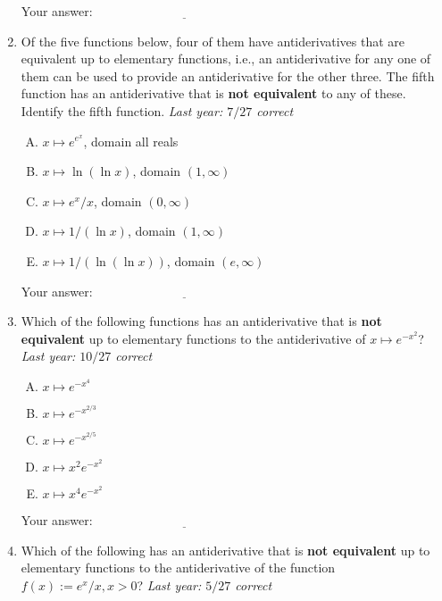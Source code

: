 \documentclass[10pt]{amsart}
\begin{document}
\begin{enumerate}
  \vspace{0.1in}
  Your answer: $\underline{\qquad\qquad\qquad\qquad\qquad\qquad\qquad}$
  \vspace{0.6in}

\item Of the five functions below, four of them have antiderivatives
  that are equivalent up to elementary functions, i.e., an
  antiderivative for any one of them can be used to provide an
  antiderivative for the other three. The fifth function has an
  antiderivative that is {\bf not equivalent} to any of these. Identify
  the fifth function. {\em Last year: $7/27$ correct}

  \begin{enumerate}[(A)]
  \item $x \mapsto e^{e^x}$, domain all reals
  \item $x \mapsto \ln(\ln x)$, domain $(1,\infty)$
  \item $x \mapsto e^x/x$, domain $(0,\infty)$
  \item $x \mapsto 1/(\ln x)$, domain $(1,\infty)$
  \item $x \mapsto 1/(\ln(\ln x))$, domain $(e,\infty)$
  \end{enumerate}

  \vspace{0.1in}
  Your answer: $\underline{\qquad\qquad\qquad\qquad\qquad\qquad\qquad}$
  \vspace{0.6in}

\item Which of the following functions has an antiderivative that is
  {\bf not equivalent} up to elementary functions to the antiderivative of
  $x \mapsto e^{-x^2}$? {\em Last year: $10/27$ correct}

  \begin{enumerate}[(A)]
  \item $x \mapsto e^{-x^4}$
  \item $x \mapsto e^{-x^{2/3}}$
  \item $x \mapsto e^{-x^{2/5}}$
  \item $x \mapsto x^2e^{-x^2}$
  \item $x \mapsto x^4e^{-x^2}$
  \end{enumerate}

  \vspace{0.1in}
  Your answer: $\underline{\qquad\qquad\qquad\qquad\qquad\qquad\qquad}$
  \vspace{0.6in}

\item Which of the following has an antiderivative that is {\bf not
  equivalent} up to elementary functions to the antiderivative of the
  function $f(x) := e^x/x, x > 0$? {\em Last year: $5/27$ correct}


\end{enumerate}
\end{document}
